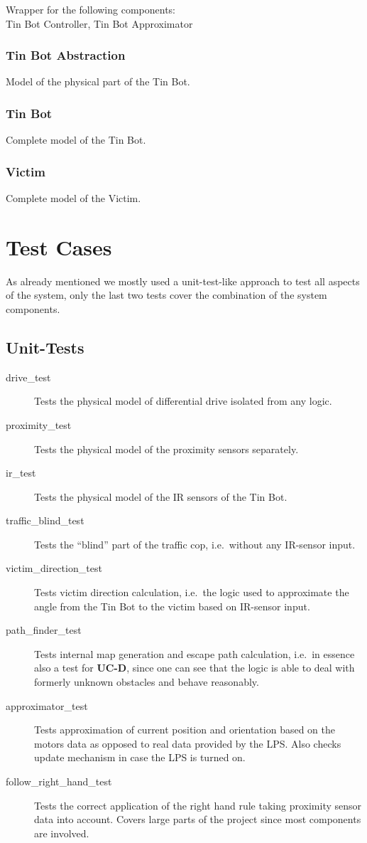\documentclass[a4paper,parskip,headheight=38pt]{scrartcl} %
\begin{document}
Wrapper for the following components: \\
Tin Bot Controller, Tin Bot Approximator

\subsubsection{Tin Bot Abstraction}
Model of the physical part of the Tin Bot.

\subsubsection{Tin Bot}
Complete model of the Tin Bot.

\subsubsection{Victim}
Complete model of the Victim.

\section{Test Cases}
As already mentioned we mostly used a unit-test-like approach to test all aspects of the system, only the last two tests cover the combination of the system components.

\subsection{Unit-Tests}
\begin{description}
\item[drive\_test] Tests the physical model of differential drive isolated from any logic.
\item[proximity\_test] Tests the physical model of the proximity sensors separately. %
\item[ir\_test] Tests the physical model of the IR sensors of the Tin Bot.
\item[traffic\_blind\_test] Tests the \enquote{blind} part of the traffic cop, i.e.\ without any IR-sensor input.
\item[victim\_direction\_test] Tests victim direction calculation, i.e.\ the logic used to approximate the angle from the Tin Bot to the victim based on IR-sensor input.
\item[path\_finder\_test] Tests internal map generation and escape path calculation, i.e.\ in essence also a test for \textbf{UC-D}, since one can see that the logic is able to deal with formerly unknown obstacles and behave reasonably.
\item[approximator\_test] Tests approximation of current position and orientation based on the motors data as opposed to real data provided by the LPS. Also checks update mechanism in case the LPS is turned on.
\item[follow\_right\_hand\_test] Tests the correct application of the right hand rule taking proximity sensor data into account. Covers large parts of the project since most components are involved.
\end{description}
\end{document}
